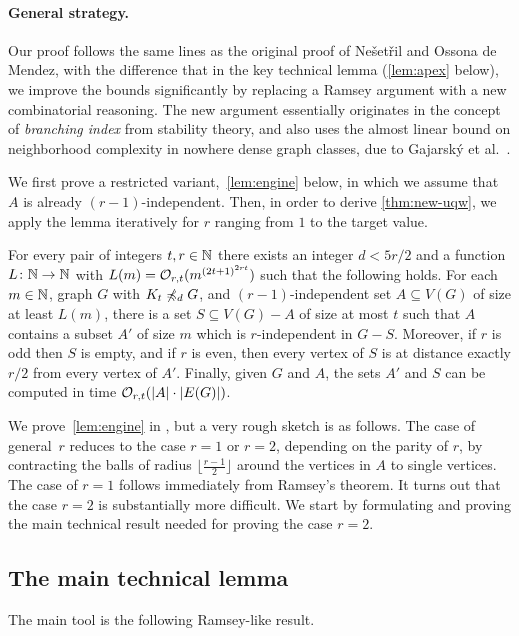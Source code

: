 \paragraph{General strategy.}
Our proof follows the same lines as the original proof of Ne\v set\v ril and Ossona de Mendez, with the difference that in the key technical lemma (\cref{lem:apex} below), 
we improve the bounds significantly by replacing a Ramsey argument with a new combinatorial reasoning.
The new argument essentially originates in the concept of {\em{branching index}} from stability theory, 
and also uses the almost linear bound on neighborhood complexity in nowhere dense graph classes, due to Gajarsk\'y et al.~\cite{gajarsky2017kernelization}.

We first prove a restricted variant,~\cref{lem:engine} below, in which we assume that $A$ is already $(r-1)$-independent. Then, in order to derive
\cref{thm:new-uqw}, we apply the lemma iteratively for $r$ ranging from $1$ to the target value.

\begin{lemma}\label{lem:engine}
For every pair of integers $t,r\in \mathbb{N}$ there exists an integer $d<5r/2$ and a function $L\colon \mathbb{N}\to \mathbb{N}$ with $L(m)=\mathcal{O}_{r,t}{(m^{{(2t+1)}^{2rt}})}$ such that the following holds.
For each $m\in \mathbb{N}$, graph $G$ with $K_t\not\preccurlyeq_{d} G$, and
$(r-1)$-independent set $A\subseteq V(G)$ of size at least $L(m)$, there is a set $S\subseteq V(G)-A$ of size at most $t$ such that $A$ contains a subset $A'$ of size $m$ which is $r$-independent in $G-S$.
Moreover, if $r$ is odd then $S$ is empty, and if $r$ is even,
then every vertex of $S$ is at distance exactly $r/2$ from every vertex of $A'$.
Finally, given $G$ and $A$, the sets $A'$ and $S$ can be computed in time $\mathcal{O}_{r,t}(|A|\cdot |E(G)|)$.
\end{lemma}

We prove~\cref{lem:engine} in , but  a very rough sketch is as follows.
The  case of general~$r$ reduces to the case $r=1$ or $r=2$, depending on the parity of $r$,
by contracting the balls of radius $\lfloor \frac {r-1} 2\rfloor $ around the vertices in $A$ to single vertices.
The case of $r=1$ follows immediately from Ramsey's theorem. 
It turns out that the case $r=2$ is substantially more difficult.
We start by formulating and proving the main technical result needed for proving the case $r=2$.

\subsection{The main technical lemma}
The main tool is the following Ramsey-like result.

